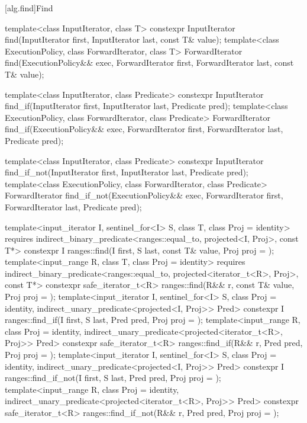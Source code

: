 [alg.find]{Find}

%
%
%
\begin{itemdecl}
template<class InputIterator, class T>
  constexpr InputIterator find(InputIterator first, InputIterator last,
                               const T& value);
template<class ExecutionPolicy, class ForwardIterator, class T>
  ForwardIterator find(ExecutionPolicy&& exec, ForwardIterator first, ForwardIterator last,
                       const T& value);

template<class InputIterator, class Predicate>
  constexpr InputIterator find_if(InputIterator first, InputIterator last,
                                  Predicate pred);
template<class ExecutionPolicy, class ForwardIterator, class Predicate>
  ForwardIterator find_if(ExecutionPolicy&& exec, ForwardIterator first, ForwardIterator last,
                          Predicate pred);

template<class InputIterator, class Predicate>
  constexpr InputIterator find_if_not(InputIterator first, InputIterator last,
                                      Predicate pred);
template<class ExecutionPolicy, class ForwardIterator, class Predicate>
  ForwardIterator find_if_not(ExecutionPolicy&& exec,
                              ForwardIterator first, ForwardIterator last,
                              Predicate pred);

template<input_iterator I, sentinel_for<I> S, class T, class Proj = identity>
  requires indirect_binary_predicate<ranges::equal_to, projected<I, Proj>, const T*>
  constexpr I ranges::find(I first, S last, const T& value, Proj proj = {});
template<input_range R, class T, class Proj = identity>
  requires indirect_binary_predicate<ranges::equal_to, projected<iterator_t<R>, Proj>, const T*>
  constexpr safe_iterator_t<R>
    ranges::find(R&& r, const T& value, Proj proj = {});
template<input_iterator I, sentinel_for<I> S, class Proj = identity,
         indirect_unary_predicate<projected<I, Proj>> Pred>
  constexpr I ranges::find_if(I first, S last, Pred pred, Proj proj = {});
template<input_range R, class Proj = identity,
         indirect_unary_predicate<projected<iterator_t<R>, Proj>> Pred>
  constexpr safe_iterator_t<R>
    ranges::find_if(R&& r, Pred pred, Proj proj = {});
template<input_iterator I, sentinel_for<I> S, class Proj = identity,
         indirect_unary_predicate<projected<I, Proj>> Pred>
  constexpr I ranges::find_if_not(I first, S last, Pred pred, Proj proj = {});
template<input_range R, class Proj = identity,
         indirect_unary_predicate<projected<iterator_t<R>, Proj>> Pred>
  constexpr safe_iterator_t<R>
    ranges::find_if_not(R&& r, Pred pred, Proj proj = {});
\end{itemdecl}

